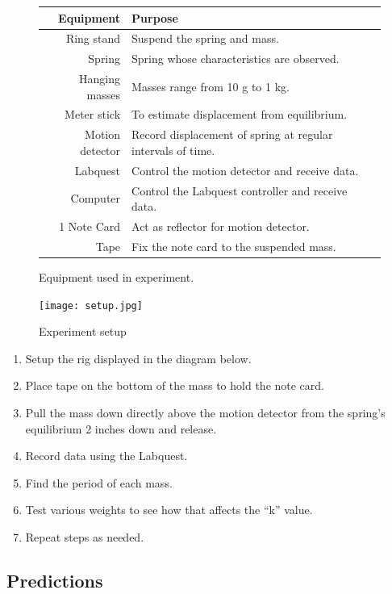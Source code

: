\documentclass{article}
\numberwithin{figure}{section}
\numberwithin{table}{section}
\begin{document}
\begin{figure}[!hbp]
    \begin{tabular}{rl} 
        \toprule
        Equipment & Purpose \\
        \midrule
        Ring stand & Suspend the spring and mass. \\
        Spring & Spring whose characteristics are observed. \\
        Hanging masses & Masses range from 10 g to 1 kg. \\
        Meter stick & To estimate displacement from equilibrium. \\
        Motion detector & Record displacement of spring at regular intervals of time. \\
        Labquest & Control the motion detector and receive data. \\
        Computer & Control the Labquest controller and receive data. \\
        1 Note Card & Act as reflector for motion detector. \\
        Tape & Fix the note card to the suspended mass. \\ 
        \bottomrule
    \end{tabular} 
    \caption{Equipment used in experiment.} 
\end{figure} 


\begin{figure}[!hbp]
    \centering
    \texttt{[image: setup.jpg]}
    \caption{Experiment setup}
\end{figure} 



\begin{enumerate} 
	\item Setup the rig displayed in the diagram below.
	\item Place tape on the bottom of the mass to hold the note card.
	\item Pull the mass down directly above the motion detector from the spring’s equilibrium 2 inches down and release.
	\item Record data using the Labquest.
	\item Find the period of each mass.
	\item Test various weights to see how that affects the “k” value.
	\item Repeat steps as needed. 
\end{enumerate} 



\subsection{Predictions} 
\end{document}
